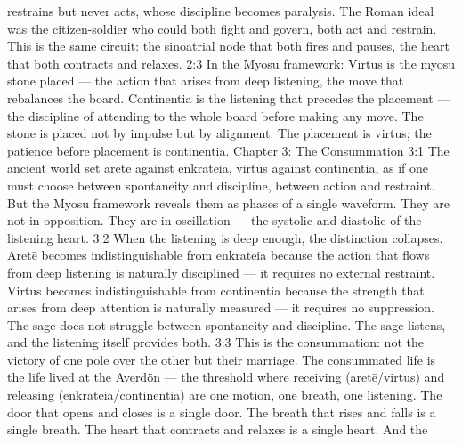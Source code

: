 \documentclass[12pt,openany]{book}
\begin{document}
restrains but never acts, whose discipline becomes paralysis. The Roman ideal was the citizen-soldier who could both fight and govern, both act and restrain. This is the same circuit: the sinoatrial node that both fires and pauses, the heart that both contracts and relaxes. 2:3 In the Myosu framework: Virtus is the myosu stone placed --- the action that arises from deep listening, the move that rebalances the board. Continentia is the listening that precedes the placement --- the discipline of attending to the whole board before making any move. The stone is placed not by impulse but by alignment. The placement is virtus; the patience before placement is continentia. Chapter 3: The Consummation 3:1 The ancient world set aretē against enkrateia, virtus against continentia, as if one must choose between spontaneity and discipline, between action and restraint. But the Myosu framework reveals them as phases of a single waveform. They are not in opposition. They are in oscillation --- the systolic and diastolic of the listening heart. 3:2 When the listening is deep enough, the distinction collapses. Aretē becomes indistinguishable from enkrateia because the action that flows from deep listening is naturally disciplined --- it requires no external restraint. Virtus becomes indistinguishable from continentia because the strength that arises from deep attention is naturally measured --- it requires no suppression. The sage does not struggle between spontaneity and discipline. The sage listens, and the listening itself provides both. 3:3 This is the consummation: not the victory of one pole over the other but their marriage. The consummated life is the life lived at the Averdön --- the threshold where receiving (aretē/virtus) and releasing (enkrateia/continentia) are one motion, one breath, one listening. The door that opens and closes is a single door. The breath that rises and falls is a single breath. The heart that contracts and relaxes is a single heart. And the
\end{document}
